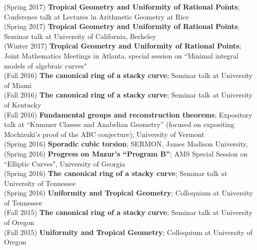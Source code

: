 \documentclass[margin,line]{res}
\begin{document}
\begin{resume}
(Spring 2017) \textbf{Tropical Geometry and Uniformity of Rational Points};
Conference talk at Lectures in Arithmetic Geometry at Rice
\vspace{.05cm}\\
(Spring 2017) \textbf{Tropical Geometry and Uniformity of Rational Points};
Seminar talk at University of California, Berkeley
\vspace{.05cm}\\
(Winter 2017) \textbf{Tropical Geometry and Uniformity of Rational Points};
Joint Mathematics Meetings in Atlanta, special session on ``Minimal integral models of algebraic curves"  
\vspace{.05cm}\\
(Fall 2016) \textbf{The canonical ring of a stacky curve};  
Seminar talk at University of Miami
\vspace{.05cm}\\
(Fall 2016) \textbf{The canonical ring of a stacky curve};  
Seminar talk at University of Kentucky
\vspace{.05cm}\\
(Fall 2016) \textbf{Fundamental groups and reconstruction theorems}; Expository talk at ``Kummer Classes and Anabelian Geometry'' (focused on expositing Mochizuki's proof of the ABC conjecture); University of Vermont  
\vspace{.05cm}\\
(Spring 2016) \textbf{Sporadic cubic torsion};  
SERMON, James Madison University, 
\vspace{.05cm}\\
(Spring 2016) \textbf{Progress on Mazur's ``Program B''};  
AMS Special Session on  ``Elliptic Curves", University of Georgia
\vspace{.05cm}\\
(Spring 2016) \textbf{The canonical ring of a stacky curve};  
Seminar talk at University of Tennessee
\vspace{.05cm}\\
(Spring 2016) \textbf{Uniformity and Tropical Geometry};
Colloquium at University of Tennessee
\vspace{.05cm}\\
(Fall 2015) \textbf{The canonical ring of a stacky curve};  
Seminar talk at University of Oregon
\vspace{.05cm}\\
(Fall 2015) \textbf{Uniformity and Tropical Geometry};
Colloquium at University of Oregon
\vspace{.05cm}\\

\end{resume}
\end{document}
